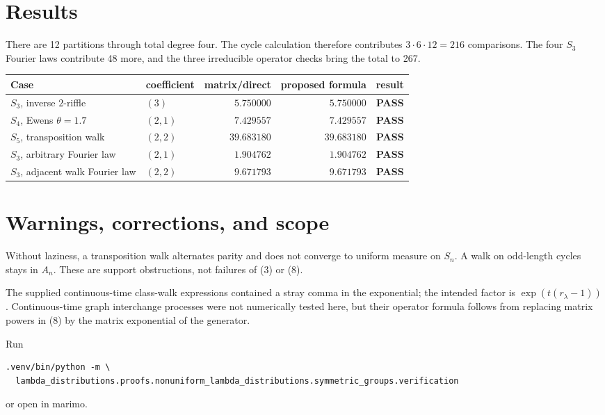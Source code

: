 \documentclass[11pt]{article}
\newcommand{\PASS}{\textcolor{passgreen}{\textbf{PASS}}}
\begin{document}
\section{Results}
There are 12 partitions through total degree four.  The cycle calculation
therefore contributes $3\cdot6\cdot12=216$ comparisons.  The four $S_3$
Fourier laws contribute 48 more, and the three irreducible operator checks
bring the total to 267.
\begin{center}
\begin{tabularx}{\linewidth}{@{}lXrrc@{}}
\toprule
Case & coefficient & matrix/direct & proposed formula & result\\
\midrule
$S_3$, inverse $2$-riffle & $(3)$ & $5.750000$ & $5.750000$ & \PASS\\
$S_4$, Ewens $\theta=1.7$ & $(2,1)$ & $7.429557$ & $7.429557$ & \PASS\\
$S_5$, transposition walk & $(2,2)$ & $39.683180$ & $39.683180$ & \PASS\\
$S_3$, arbitrary Fourier law & $(2,1)$ & $1.904762$ & $1.904762$ & \PASS\\
$S_3$, adjacent walk Fourier law & $(2,2)$ & $9.671793$ & $9.671793$ & \PASS\\
\bottomrule
\end{tabularx}
\end{center}

\section{Warnings, corrections, and scope}
Without laziness, a transposition walk alternates parity and does not converge
to uniform measure on $S_n$.  A walk on odd-length cycles stays in $A_n$.
These are support obstructions, not failures of (3) or (8).

The supplied continuous-time class-walk expressions contained a stray comma
in the exponential; the intended factor is
$\exp(t(r_\lambda-1))$.  Continuous-time graph interchange processes were not
numerically tested here, but their operator formula follows from replacing
matrix powers in (8) by the matrix exponential of the generator.

Run
\begin{verbatim}
.venv/bin/python -m \
  lambda_distributions.proofs.nonuniform_lambda_distributions.symmetric_groups.verification
\end{verbatim}
or open  in marimo.
\end{document}
